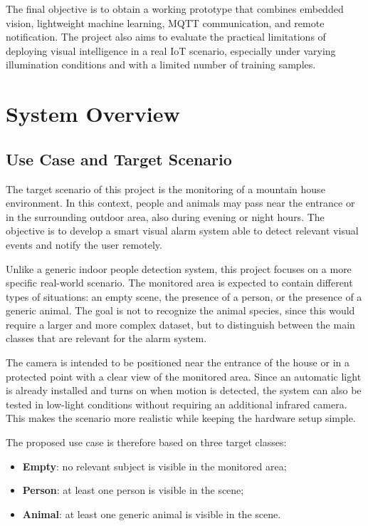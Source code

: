\documentclass{article}
\begin{document}
The final objective is to obtain a working prototype that combines embedded vision, lightweight machine learning, MQTT communication, and remote notification. The project also aims to evaluate the practical limitations of deploying visual intelligence in a real IoT scenario, especially under varying illumination conditions and with a limited number of training samples.

\section{System Overview}

\subsection{Use Case and Target Scenario}

The target scenario of this project is the monitoring of a mountain house environment. In this context, people and animals may pass near the entrance or in the surrounding outdoor area, also during evening or night hours. The objective is to develop a smart visual alarm system able to detect relevant visual events and notify the user remotely.

Unlike a generic indoor people detection system, this project focuses on a more specific real-world scenario. The monitored area is expected to contain different types of situations: an empty scene, the presence of a person, or the presence of a generic animal. The goal is not to recognize the animal species, since this would require a larger and more complex dataset, but to distinguish between the main classes that are relevant for the alarm system.

The camera is intended to be positioned near the entrance of the house or in a protected point with a clear view of the monitored area. Since an automatic light is already installed and turns on when motion is detected, the system can also be tested in low-light conditions without requiring an additional infrared camera. This makes the scenario more realistic while keeping the hardware setup simple.

The proposed use case is therefore based on three target classes:
\begin{itemize}
    \item \textbf{Empty}: no relevant subject is visible in the monitored area;
    \item \textbf{Person}: at least one person is visible in the scene;
    \item \textbf{Animal}: at least one generic animal is visible in the scene.
\end{itemize}
\end{document}
